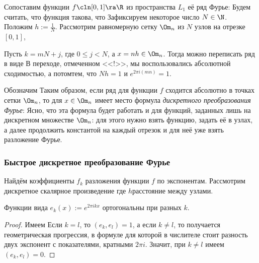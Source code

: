 \documentclass[a4paper]{article}
\begin{document}
Сопоставим функции $f\cln[0,1]\ra \R$ из пространства $L_1$ её ряд Фурье:
Будем считать, что функция такова, что
Зафиксируем некоторое число $N \in \N$. Положим $h:=\frac1N$. Рассмотрим равномерную сетку $\Om_n$ из $N$ узлов
на отрезке $[0,1]$,  

Пусть $ k =mN + j$, где $0\le j < N$, а $x = nh \in \Om_n$. Тогда можно переписать ряд в виде
В переходе, отмеченном <<!>>, мы воспользовались абсолютной сходимостью, а потом\т тем, что
$Nh=1$ и $e^{2\pi i (mn)}=1$.

Обозначим
Таким образом, если ряд для функции $f$ сходится абсолютно в точках сетки $\Om_n$, то для $x\in \Om_n$ имеет место формула
\emph{дискретного преобразования Фурье}:
Ясно, что эта формула будет работать и для функций, заданных лишь на дискретном множестве $\Om_n$:
для этого нужно взять функцию, задать её в узлах, а далее продолжить константой на каждый отрезок
и для неё уже взять разложение Фурье.

\subsubsection{Быстрое дискретное преобразование Фурье}

Найдём коэффициенты $f_k$ разложения функции $f$ по экспонентам. Рассмотрим дискретное скалярное произведение
где $h$\т расстояние между узлами.

\begin{stm}
Функции вида $e_k(x) := e^{2\pi ik x}$ ортогональны при разных $k$.
\end{stm}
\begin{proof}
Имеем
Если $k=l$, то $(e_k,e_l) = 1$, а если $k\neq l$, то получается геометрическая прогрессия, в формуле для которой в числителе
стоит разность двух экспонент с показателями, кратными $2\pi i$. Значит, при $k\neq l$ имеем $(e_k,e_l) =0$.
\end{proof}
\end{document}
